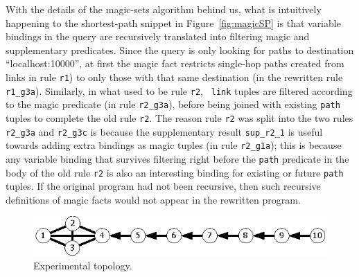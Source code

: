 \documentclass{sigmod08}
\newcommand{\ol}[1]{\texttt{\small #1}\xspace}
\begin{document}
With the details of the magic-sets algorithm behind us, what is
intuitively happening to the shortest-path snippet in
Figure~\ref{fig:magicSP} is that variable bindings in the query are
recursively translated into filtering magic and supplementary
predicates. Since the query is only looking for paths to
destination ``localhost:10000'', at first the magic fact restricts single-hop
paths created from links in rule
\ol{r1}) to only those with that same destination (in the rewritten
rule \ol{r1\_g3a}). Similarly, in what used to be rule \ol{r2}, {\tt
  link} tuples are filtered according to the magic predicate (in rule
\ol{r2\_g3a}), before being joined with existing \ol{path} tuples to
complete the old rule \ol{r2}. The reason rule \ol{r2} was split into
the two rules \ol{r2\_g3a} and \ol{r2\_g3c} is because the
supplementary result \ol{sup\_r2\_1} is useful towards adding extra bindings as
magic tuples (in rule \ol{r2\_g1a}); this is because any variable
binding that survives filtering right before the \ol{path}
predicate in the body of the old rule \ol{r2} is also an interesting
binding for existing or future \ol{path} tuples. If the original
program had not been recursive, then such recursive definitions of magic
facts would not appear in the rewritten program.

\begin{figure}
\centering
\includegraphics{visio/Topology}
\caption{Experimental topology.}
\label{fig:topo}
\end{figure}
\end{document}
